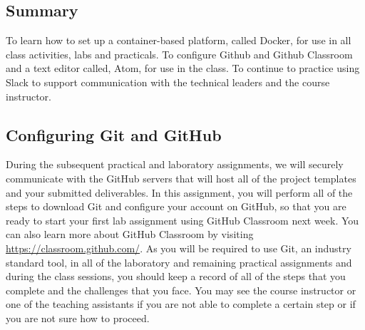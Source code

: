 
\newcommand{\command}[1]{``\lstinline{#1}''}
\newcommand{\program}[1]{\lstinline{#1}}
\newcommand{\channel}[1]{\lstinline{#1}}
\newcommand{\option}[1]{``{#1}''}
\newcommand{\step}[1]{``{#1}''}


\long{}



\subsection*{Summary}
To learn how to set up a container-based platform, called Docker, for use in all class activities, labs and practicals. To configure Github and Github Classroom and a text editor called, Atom, for use in the class. To continue to practice using Slack to support communication with the technical leaders and the course instructor.

\vspace*{-.2in}
\subsection*{Configuring Git and GitHub}
\vspace*{-.1in}

During the subsequent practical and  laboratory assignments, we will securely communicate
with the GitHub servers that will host all of the project templates and your submitted deliverables. In this assignment,
you will perform all of the steps to download Git and configure your account on GitHub, so that you are ready to start your first lab assignment using
GitHub Classroom next week.  You can
also learn more about GitHub Classroom by visiting \url{https://classroom.github.com/}. As you will be required to use
Git, an industry standard tool, in all of the  laboratory and remaining practical assignments and during the class
sessions, you should keep a record of all of the steps that you complete and the challenges that you face. You may see
the course instructor or one of the teaching assistants if you are not able to complete a certain step or if you are not
sure how to proceed.

